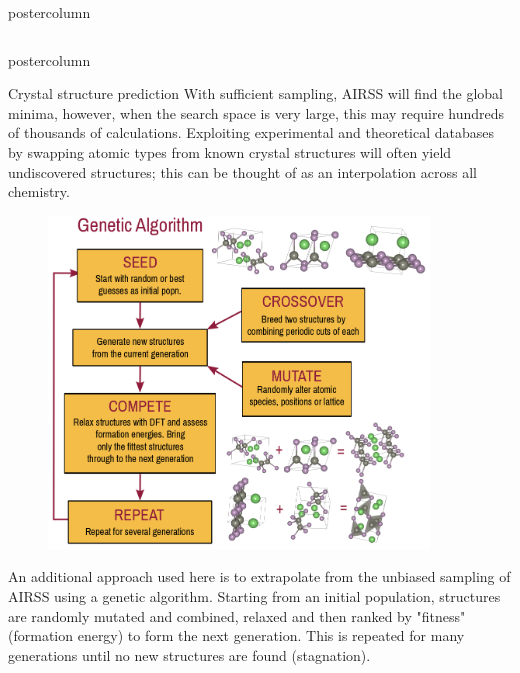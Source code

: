\documentclass{beamer}
\begin{document}
\begin{frame}
\begin{columns}
\begin{column}{.65\textwidth}
\begin{beamercolorbox}[center]{postercolumn}
\begin{minipage}{.98\textwidth}
{\begin{columns}
\begin{column}{.48\textwidth}
\begin{beamercolorbox}[right]{postercolumn}
\begin{minipage}{\textwidth}
{\begin{myblock}{Crystal structure prediction}
              With sufficient sampling, AIRSS will find the global minima, however, when the search space is very large, this may require hundreds of thousands of calculations. Exploiting experimental and theoretical databases by swapping atomic types from known crystal structures will often yield undiscovered structures; this can be thought of as an interpolation across all chemistry.
                \vspace{0.2in}
              \begin{figure}
                \centering
              \includegraphics[width=0.9\textwidth]{img/ga.png}
          \end{figure}

An additional approach used here is to extrapolate from the unbiased sampling of AIRSS using a genetic algorithm. Starting from an initial population, structures are randomly mutated and combined, relaxed and then ranked by "fitness" (formation energy) to form the next generation. This is repeated for many generations until no new structures are found (stagnation).

					\end{myblock}\vfill
		}\end{minipage}\end{beamercolorbox}
	\end{column}
  \end{columns}
		}\end{minipage}\end{beamercolorbox}
  \end{column}
    

\end{columns}
\end{frame}
\end{document}
